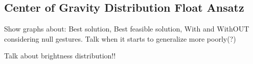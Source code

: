 \subsection{Center of Gravity Distribution Float Ansatz}
Show graphs about:
Best solution,
Best feasible solution,
With and WithOUT considering null gestures.
Talk when it starts to generalize more poorly(?)

Talk about brightness distribution!!